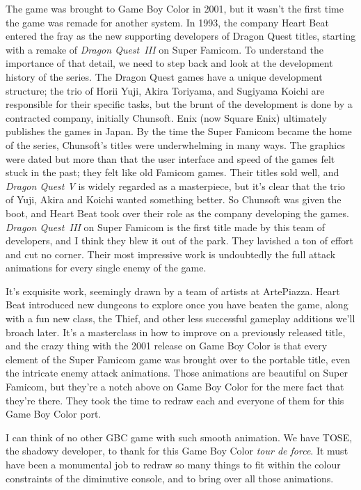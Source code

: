 \documentclass{book}
\begin{document}
The game was brought to Game Boy Color in 2001, but it wasn’t the first time the game was remade for another system. In 1993, the company Heart Beat entered the fray as the new supporting developers of Dragon Quest titles, starting with a remake of \emph{Dragon Quest~III} on Super Famicom. To understand the importance of that detail, we need to step back and look at the development history of the series. The Dragon Quest games have a unique development structure; the trio of Horii Yuji, Akira Toriyama, and Sugiyama Koichi are responsible for their specific tasks, but the brunt of the development is done by a contracted company, initially Chunsoft. Enix (now Square Enix) ultimately publishes the games in Japan. By the time the Super Famicom became the home of the series, Chunsoft’s titles were underwhelming in many ways. The graphics were dated but more than that the user interface and speed of the games felt stuck in the past; they felt like old Famicom games. Their titles sold well, and \emph{Dragon Quest V} is widely regarded as a masterpiece, but it’s clear that the trio of Yuji, Akira and Koichi wanted something better. So Chunsoft was given the boot, and Heart Beat took over their role as the company developing the games. \emph{Dragon Quest~III} on Super Famicom is the first title made by this team of developers, and I think they blew it out of the park. They lavished a ton of effort and cut no corner. Their most impressive work is undoubtedly the full attack animations for every single enemy of the game.\par
It’s exquisite work, seemingly drawn by a team of artists at ArtePiazza. Heart Beat introduced new dungeons to explore once you have beaten the game, along with a fun new class, the Thief, and other less successful gameplay additions we’ll broach later. It’s a masterclass in how to improve on a previously released title, and the crazy thing with the 2001 release on Game Boy Color is that every element of the Super Famicom game was brought over to the portable title, even the intricate enemy attack animations. Those animations are beautiful on Super Famicom, but they’re a notch above on Game Boy Color for the mere fact that they’re there. They took the time to redraw each and everyone of them for this Game Boy Color port.\par
I can think of no other GBC game with such smooth animation. We have TOSE, the shadowy developer, to thank for this Game Boy Color \emph{tour de force}. It must have been a monumental job to redraw so many things to fit within the colour constraints of the diminutive console, and to bring over all those animations.\par
\end{document}
